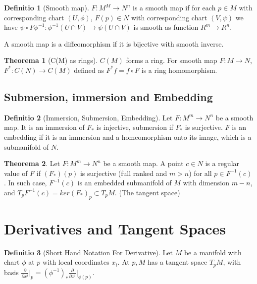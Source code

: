 \documentclass[12pt, a4paper]{article}
\theoremstyle{definition}
\newtheorem{theorem}{Theorema}[section]
\newtheorem{definition}{Definitio}[section]
\theoremstyle{remark}
\begin{document}
\begin{definition}[Smooth map]
	$F: M^M \rightarrow N^n$ is a smooth map if for each $p \in M$ with corresponding chart $(U, \phi)$, $F(p) \in N$ with corresponding chart $(V, \psi)$ we have $\psi \circ F \phi^{-1}: \phi^{-1}(U \cap V) \rightarrow \psi(U \cap V)$ is smooth as function $R^m \rightarrow R^n$.

	A smooth map is a diffeomorphism if it is bijective with smooth inverse.
\end{definition}

\begin{theorem}[C(M) as rings]
	$C(M)$ forms a ring. For smooth map $F: M \rightarrow N$, $F^*: C(N) \rightarrow C(M)$ defined as $F^* f = f\circ F$ is a ring homomorphism.
\end{theorem}

\subsection{Submersion, immersion and Embedding}

\begin{definition}[Immersion, Submersion, Embedding]
	Let $F: M^m \rightarrow N^n$ be a smooth map.
	It is an immersion of $F_*$ is injective, submersion if $F_*$ is surjective. $F$ is an embedding if it is an immersion and a homeomorphism onto its image, which is a submanifold of $N$.
\end{definition}

\begin{theorem}
	Let $F: M^m \rightarrow N^n$ be a smooth map. A point $c \in N$ is a regular value of $F$ if $(F_*)(p)$ is surjective (full ranked and $m > n$) for all $p \in F^{-1}(c)$.
	In such case, $F^{-1}(c)$ is an embedded submanifold of $M$ with dimension $m-n$, and $T_pF^{-1}(c) = ker(F_*)_p \subset T_pM$. (The tangent space)
\end{theorem}


\section{Derivatives and Tangent Spaces}

\begin{definition}[Short Hand Notation For Derivative]
	Let $M$ be a manifold with chart $\phi$ at $p$ with local coordinates $x_i$. 
	At $p, M$ has a tangent space $T_pM$, with basis $\frac{\partial}{\partial x^i}\big\rvert_p = (\phi^{-1})_* \frac{\partial }{\partial x^i}\big\rvert_{\phi(p)}$. 
\end{definition}
\end{document}
